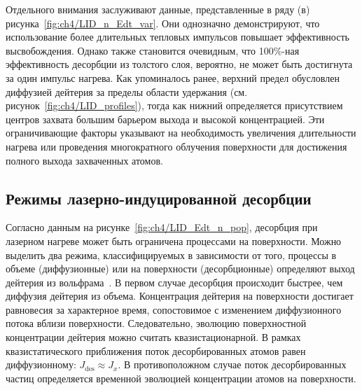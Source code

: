 Отдельного внимания заслуживают данные, представленные в ряду (в) рисунка~\cref{fig:ch4/LID_n_Edt_var}. Они однозначно демонстрируют, что использование более длительных тепловых импульсов повышает эффективность высвобождения. Однако также становится очевидным, что 100\%-ная эффективность десорбции из толстого слоя, вероятно, не может быть достигнута за один импульс нагрева. Как упоминалось ранее, верхний предел обусловлен диффузией дейтерия за пределы области удержания (см. рисунок~\cref{fig:ch4/LID_profiles}), тогда как нижний определяется присутствием центров захвата большим барьером выхода и высокой концентрацией. Эти ограничивающие факторы указывают на необходимость увеличения длительности нагрева или проведения многократного облучения поверхности для достижения полного выхода захваченных атомов.

\subsection{Режимы лазерно-индуцированной десорбции}\label{sec:ch4/seс3/subsec3}

Согласно данным на рисунке~\cref{fig:ch4/LID_Edt_n_pop}, десорбция при лазерном нагреве может быть ограничена процессами на поверхности. Можно выделить два режима, классифицируемых в зависимости от того, процессы в объеме (диффузионные) или на поверхности (десорбционные) определяют выход дейтерия из вольфрама~\cite{Guterl2019}. В первом случае десорбция происходит быстрее, чем диффузия дейтерия из объема. Концентрация дейтерия на поверхности достигает равновесия за характерное время, сопостовимое с изменением диффузионного потока вблизи поверхности. Следовательно, эволюцию поверхностной концентрации дейтерия можно считать квазистационарной. В рамках квазистатического приближения поток десорбированных атомов равен диффузионному: \( J_\mathrm{des}\approx J_{x} \). В противоположном случае поток десорбированных частиц определяется временной эволюцией концентрации атомов на поверхности.


